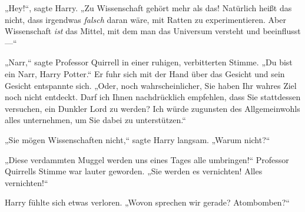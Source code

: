 „Hey!“, sagte Harry. „Zu Wissenschaft gehört mehr als das! Natürlich heißt das nicht, dass irgendwas \emph{falsch} daran wäre, mit Ratten zu experimentieren. Aber Wissenschaft \emph{ist} das Mittel, mit dem man das Universum versteht und beeinflusst—“

„Narr,“ sagte Professor Quirrell in einer ruhigen, verbitterten Stimme. „Du bist ein Narr, Harry Potter.“ Er fuhr sich mit der Hand über das Gesicht und sein Gesicht entspannte sich. „Oder, noch wahrscheinlicher, Sie haben Ihr wahres Ziel noch nicht entdeckt. Darf ich Ihnen nachdrücklich empfehlen, dass Sie stattdessen versuchen, ein Dunkler Lord zu werden? Ich würde zugunsten des Allgemeinwohls alles unternehmen, um Sie dabei zu unterstützen.“

„Sie mögen Wissenschaften nicht,“ sagte Harry langsam. „Warum nicht?“

„Diese verdammten Muggel werden uns eines Tages alle umbringen!“ Professor Quirrells Stimme war lauter geworden. „Sie werden es vernichten! Alles vernichten!“

Harry fühlte sich etwas verloren. „Wovon sprechen wir gerade? Atombomben?“

